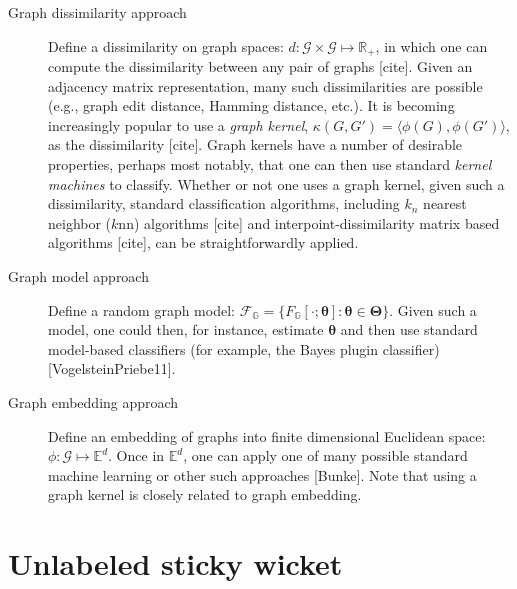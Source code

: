 \documentclass{article} %
\providecommand{\ve}[1]{\boldsymbol{#1}}
\newcommand{\EE}{\mathbb{E}}           %
\newcommand{\bth}{\ve{\theta}}
\newcommand{\bTh}{\ve{\Theta}}
\providecommand{\mc}[1]{\mathcal{#1}}
\newcommand{\Real}{\mathbb{R}}
\newcommand{\GG}{\mathbb{G}}
\begin{document}
\begin{description}
	\item[Graph dissimilarity approach] Define a dissimilarity on graph spaces: $d: \mc{G} \times \mc{G} \mapsto \Real_+$, in which one can compute the dissimilarity between any pair of graphs [cite]. Given an adjacency matrix representation, many such dissimilarities are possible (e.g., graph edit distance, Hamming distance, etc.).  It is becoming increasingly popular to use a \emph{graph kernel}, $\kappa(G,G')=\langle \phi(G), \phi(G') \rangle$, as the dissimilarity [cite].  Graph kernels have a number of desirable properties, perhaps most notably, that one can then use standard \emph{kernel machines} to classify.	Whether or not one uses a graph kernel, given such a dissimilarity, standard classification algorithms, including $k_n$ nearest neighbor ($k$nn) algorithms [cite] and interpoint-dissimilarity matrix based algorithms [cite], can be straightforwardly applied.  
	\item[Graph model approach] Define a random graph model: $\mc{F}_{\GG} = \{F_{\GG}[\cdot; \bth] : \bth \in \bTh\}$.  Given such a model, one could then, for instance, estimate $\bth$ and then use standard model-based classifiers (for example, the Bayes plugin classifier) [VogelsteinPriebe11]. 
	\item[Graph embedding approach] Define an embedding of graphs into finite dimensional Euclidean space: $\phi: \mc{G} \mapsto \EE^d$.  Once in $\EE^d$, one can apply one of many possible standard machine learning or other such approaches [Bunke]. Note that using a graph kernel is closely related to graph embedding.
\end{description}



\section{Unlabeled sticky wicket}
\end{document}
